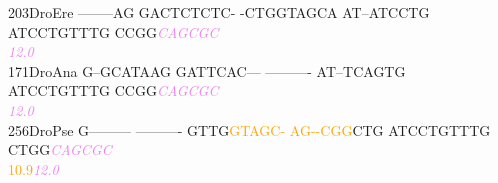 \documentclass[11pt,twoside,reqno,a4paper]{article}
\begin{document}
{203\hspace*{1\charwidth}DroEre	--------AG	GACTCTCTC-	-CTGGTAGCA	AT--ATCCTG	ATCCTGTTTG	CCGG\textit{\textcolor{violet}{C}}\textit{\textcolor{violet}{A}}\textit{\textcolor{violet}{G}}\textit{\textcolor{violet}{C}}\textit{\textcolor{violet}{G}}\textit{\textcolor{violet}{C}}	\\
\hspace*{4\charwidth}\hspace*{7\charwidth}\hspace*{1\charwidth}\hspace*{1\charwidth}\hspace*{1\charwidth}\hspace*{1\charwidth}\hspace*{1\charwidth}\hspace*{54\charwidth}\textit{\textcolor{violet}{12.0}}\hspace*{1\charwidth}\\
171\hspace*{1\charwidth}DroAna	G--GCATAAG	GATTCAC---	----------	AT--TCAGTG	ATCCTGTTTG	CCGG\textit{\textcolor{violet}{C}}\textit{\textcolor{violet}{A}}\textit{\textcolor{violet}{G}}\textit{\textcolor{violet}{C}}\textit{\textcolor{violet}{G}}\textit{\textcolor{violet}{C}}	\\
\hspace*{4\charwidth}\hspace*{7\charwidth}\hspace*{1\charwidth}\hspace*{1\charwidth}\hspace*{1\charwidth}\hspace*{1\charwidth}\hspace*{1\charwidth}\hspace*{54\charwidth}\textit{\textcolor{violet}{12.0}}\hspace*{1\charwidth}\\
256\hspace*{1\charwidth}DroPse	G---------	----------	GTTG\textcolor{orange}{G}\textcolor{orange}{T}\textcolor{orange}{A}\textcolor{orange}{G}\textcolor{orange}{C}\textcolor{orange}{-}	\textcolor{orange}{A}\textcolor{orange}{G}\textcolor{orange}{-}\textcolor{orange}{-}\textcolor{orange}{C}\textcolor{orange}{G}\textcolor{orange}{G}CTG	ATCCTGTTTG	CTGG\textit{\textcolor{violet}{C}}\textit{\textcolor{violet}{A}}\textit{\textcolor{violet}{G}}\textit{\textcolor{violet}{C}}\textit{\textcolor{violet}{G}}\textit{\textcolor{violet}{C}}	\\
\hspace*{4\charwidth}\hspace*{7\charwidth}\hspace*{1\charwidth}\hspace*{1\charwidth}\hspace*{24\charwidth}\textcolor{orange}{10.9}\hspace*{1\charwidth}\hspace*{1\charwidth}\hspace*{1\charwidth}\hspace*{26\charwidth}\textit{\textcolor{violet}{12.0}}\hspace*{1\charwidth}\\
}
\end{document}
